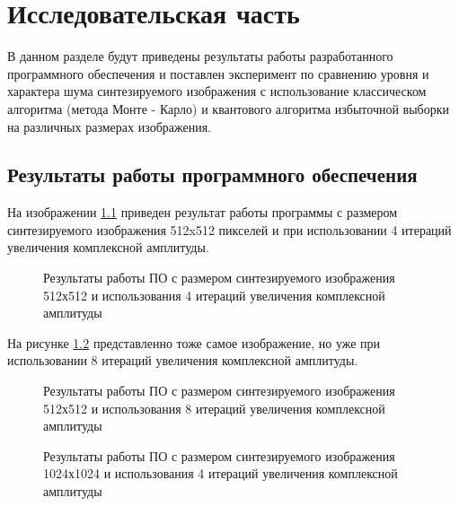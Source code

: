 \chapter{Исследовательская часть}

В данном разделе будут приведены результаты работы разработанного программного обеспечения и поставлен эксперимент по сравнению уровня и характера шума синтезируемого изображения с использование классическом алгоритма (метода Монте - Карло) и квантового алгоритма избыточной выборки на различных размерах изображения.

\section{Результаты работы программного обеспечения}

На изображении \ref{img:example_01} приведен результат работы программы с размером синтезируемого изображения 512x512 пикселей и при использовании 4 итераций увеличения комплексной амплитуды. 

\begin{figure}[H]
	\begin{center}
	\end{center}
	\captionsetup{justification=centering}
	\caption{Результаты работы ПО с размером синтезируемого изображения 512х512 и использования 4 итераций увеличения комплексной амплитуды}
	\label{img:example_01}
\end{figure}

На рисунке \ref{img:example_02} представленно тоже самое изображение, но уже при использовании 8 итераций увеличения комплексной амплитуды. 

\begin{figure}[H]
	\begin{center}
	\end{center}
	\captionsetup{justification=centering}
	\caption{Результаты работы ПО с размером синтезируемого изображения 512х512 и использования 8 итераций увеличения комплексной амплитуды}
	\label{img:example_02}
\end{figure}

\begin{figure}[H]
	\begin{center}
	\end{center}
	\captionsetup{justification=centering}
	\caption{Результаты работы ПО с размером синтезируемого изображения 1024х1024 и использования 4 итераций увеличения комплексной амплитуды}
	\label{img:example_03}
\end{figure}

